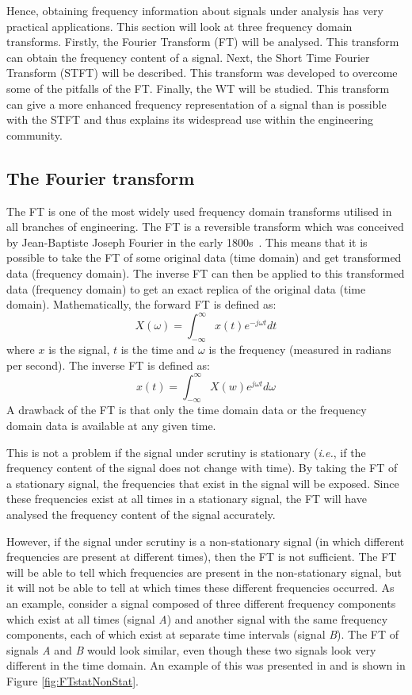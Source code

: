 \documentclass[12pt]{report}
\begin{document}
Hence, obtaining frequency information about signals under analysis has very practical applications.
This section will look at three frequency domain transforms.
Firstly, the Fourier Transform (FT) will be analysed. This transform can obtain the
frequency content of a signal. Next, the Short Time Fourier Transform (STFT) will be described.
This transform was developed to overcome some of the pitfalls of the FT.
Finally, the WT will be studied. This transform can give a more enhanced 
frequency representation of a signal than is possible with the STFT
and thus explains its widespread use within the engineering community.

\subsection{The Fourier transform}
The FT is one of the most widely used frequency domain transforms utilised in all branches of engineering.
The FT is a reversible transform which was conceived by Jean-Baptiste Joseph Fourier in the early 1800s~\cite{jfprice}. 
This means that it is possible to 
take the FT of some original data (time domain) and get transformed data (frequency domain). The 
inverse FT can then be applied to this 
transformed data (frequency domain) to get an exact replica of the original data (time domain).
Mathematically, the forward FT is defined as:
\begin{equation}
	X(\omega) = \int_{-\infty}^{\infty} x(t) e^{-j\omega t} dt
\end{equation}
where $x$ is the signal, $t$ is the time and $\omega$ is the frequency (measured in radians per second). 
The inverse FT is defined as:
\begin{equation} 
	x(t)=\int_{-\infty}^{\infty} X(w) e^{j\omega t} d\omega
\end{equation} 
A drawback of the FT is that only the time domain data or the frequency domain data
is available at any given time.

This is not a problem if the signal under scrutiny is stationary (\emph{i.e.}, if the frequency content
of the signal does not change with time). By taking the FT of a stationary signal, the frequencies
that exist in the signal will be exposed. Since these frequencies exist at all times in a
stationary signal, the FT will have analysed the frequency content of the signal accurately.

However, if the signal under scrutiny is a non-stationary 
signal (in which different frequencies are present at different times), then the FT is not sufficient.
The FT will be able to tell which frequencies are present in the non-stationary signal, but it will not be able to tell
at which times these different frequencies occurred. As an example, consider a signal composed of three
different frequency components which exist at all times (signal \emph{A}) and another signal 
with the same frequency components, each of which exist at separate time intervals (signal \emph{B}).
The FT of signals \emph{A} and \emph{B} would look similar, even though these two signals look very 
different in the time domain.
An example of this was presented in \cite{robi} and is shown in Figure \ref{fig:FTstatNonStat}.
\end{document}
